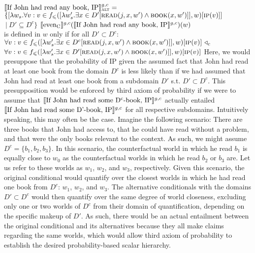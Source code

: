 \a $\intension[g,c]{If John had read any book, IP}_{\text{\scshape alt}}=$\\$\{[\lambda w_s.\forall v:v\in f_\leqslant([\lambda w'_s.\exists{x\in{D'}}[\predicate{read}(j,x,w')\land\predicate{book}(x,w')]],w)[\predicate{ip}(v)]]$\\\emptyfill$~|~D'\subseteq D^c\}$
\xe
\ex
$\intension[g,c]{even\textsubscript{C}}(\intension[g,c]{If John had read any book, IP})(w)$\\ is defined in $w$ only if for all $D'\subset D^c$:\\
$\forall v:v\in f_\leqslant([\lambda w'_s.\exists{x\in D^c}[\predicate{read}(j,x,w')\land\predicate{book}(x,w')]],w)[\predicate{ip}(v)]~\lprob_c$\\\emptyfill$\forall v:v\in f_\leqslant([\lambda w'_s.\exists{x\in D'}[\predicate{read}(j,x,w')\land\predicate{book}(x,w')]],w)[\predicate{ip}(v)]$
\xe
Here, we would presuppose that the probability of IP given the assumed fact that John had read at least one book from the domain $D^c$ is less likely than if we had assumed that John had read at least one book from a subdomain $D'$ s.t. $D'\subset D^c$. This presupposition would be enforced by  third axiom of probability if we were to assume that $\intension[g,c]{If John had read some D\textsuperscript{c}-book, IP}$ actually entailed $\intension[g,c]{If John had read some D'-book, IP}$ for all respective subdomains. Intuitively speaking, this may often be the case. Imagine the following scenario: There are three books that John had access to, that he could have read without a problem, and that were the only books relevant to the context. As such, we might assume $D^c=\{b_1,b_2,b_3\}$. In this scenario, the counterfactual world in which he read $b_1$ is equally close to $w_0$ as the counterfactual worlds in which he read $b_2$ or $b_3$ are. Let us refer to these worlds as $w_1$, $w_2$, and $w_3$, respectively. Given this scenario, the original conditional would quantify over the closest worlds in which he had read one book from $D^c$: $w_1$, $w_2$, and $w_3$. The alternative conditionals with the domains $D'\subset D^c$ would then quantify over the same degree of world closeness, excluding only one or two worlds of $D^c$ from their domain of quantification, depending on the specific makeup of $D'$. As such, there would be an actual entailment between the original conditional and its alternatives because they all make claims regarding the same worlds, which would allow  third axiom of probability to establish the desired probability-based scalar hierarchy.

